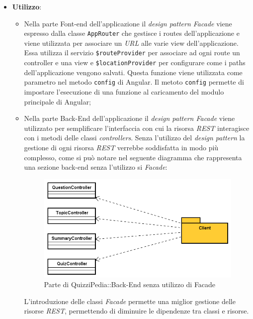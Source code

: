 \begin{itemize}
\item \textbf{Utilizzo}:
	\begin{itemize}
		\item  Nella parte Font-end dell'applicazione il \textit{design pattern Facade} viene espresso dalla classe \texttt{AppRouter} che gestisce i routes dell'applicazione e viene utilizzata per associare un \textit{URL} alle varie view dell'applicazione. Essa utilizza il servizio \texttt{\$routeProvider} per associare ad ogni route un controller e una view e \texttt{\$locationProvider} per configurare come i paths dell'applicazione vengono salvati. Questa funzione viene utilizzata come parametro nel metodo \texttt{config} di Angular. Il metoto \texttt{config} permette di impostare l'esecuzione di una funzione al caricamento del modulo principale di Angular;
		\item Nella parte Back-End dell'applicazione il \textit{design pattern Facade} viene utilizzato per semplificare l'interfaccia con cui la risorsa \textit{REST} interagisce con i metodi delle classi \textit{controllers}.
		Senza l'utilizzo del \textit{design pattern} la gestione di ogni risorsa \textit{REST} verrebbe soddisfatta in modo più complesso, come si può notare nel seguente diagramma che rappresenta una sezione back-end senza l'utilizzo si \textit{Facade}:
		\label{Parte di QuizziPedia::Back-End senza utilizzo di Facade}
		\begin{figure} [ht]
			\centering
			\includegraphics[scale=0.50]{UML/strutturaPattern/FacadeNoUtilizzo.png}
			\caption{Parte di QuizziPedia::Back-End senza utilizzo di Facade}
		\end{figure}\FloatBarrier
		L'introduzione delle classi \textit{Facade} permette una miglior gestione delle risorse \textit{REST}, permettendo di diminuire le dipendenze tra classi e risorse.

\end{itemize}
\end{itemize}
